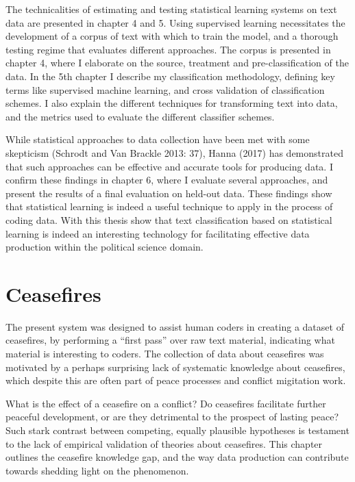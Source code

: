 \documentclass[12pt,twoside]{reedthesis}
\begin{document}
The technicalities of estimating and testing statistical learning
systems on text data are presented in chapter 4 and 5. Using supervised
learning necessitates the development of a corpus of text with which to
train the model, and a thorough testing regime that evaluates different
approaches. The corpus is presented in chapter 4, where I elaborate on
the source, treatment and pre-classification of the data. In the 5th
chapter I describe my classification methodology, defining key terms
like supervised machine learning, and cross validation of classification
schemes. I also explain the different techniques for transforming text
into data, and the metrics used to evaluate the different classifier
schemes.

While statistical approaches to data collection have been met with some
skepticism (Schrodt and Van Brackle 2013: 37), Hanna (2017) has
demonstrated that such approaches can be effective and accurate tools
for producing data. I confirm these findings in chapter 6, where I
evaluate several approaches, and present the results of a final
evaluation on held-out data. These findings show that statistical
learning is indeed a useful technique to apply in the process of coding
data. With this thesis show that text classification based on
statistical learning is indeed an interesting technology for
facilitating effective data production within the political science
domain.

\chapter{Ceasefires}\label{ceasefires}

The present system was designed to assist human coders in creating a
dataset of ceasefires, by performing a ``first pass'' over raw text
material, indicating what material is interesting to coders. The
collection of data about ceasefires was motivated by a perhaps
surprising lack of systematic knowledge about ceasefires, which despite
this are often part of peace processes and conflict migitation work.

What is the effect of a ceasefire on a conflict? Do ceasefires
facilitate further peaceful development, or are they detrimental to the
prospect of lasting peace? Such stark contrast between competing,
equally plausible hypotheses is testament to the lack of empirical
validation of theories about ceasefires. This chapter outlines the
ceasefire knowledge gap, and the way data production can contribute
towards shedding light on the phenomenon.
\end{document}
